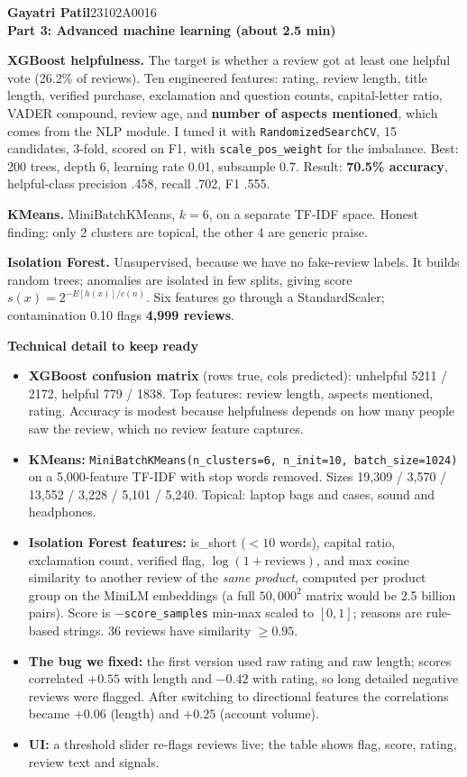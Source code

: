 \documentclass[10pt,a4paper]{article}
\newcommand{\lab}[1]{{\color{accent}\bfseries #1}}
\newcommand{\speaker}[3]{%
  \begin{tcolorbox}[colback=navy,colframe=navy,arc=3pt,left=8pt,right=8pt,top=4pt,bottom=4pt]
  {\color{white}\bfseries\Large #1}\hfill{\color{white!70!navy}\small #2}\\[1pt]{\color{accent!60!white}\bfseries #3}
  \end{tcolorbox}\vspace{-2pt}}
\begin{document}
\speaker{Gayatri Patil}{23102A0016}{Part 3: Advanced machine learning \quad (about 2.5 min)}
\begin{say}
\lab{XGBoost helpfulness.} The target is whether a review got at least one helpful vote (26.2\% of reviews). Ten engineered features: rating, review length, title length, verified purchase, exclamation and question counts, capital-letter ratio, VADER compound, review age, and \textbf{number of aspects mentioned}, which comes from the NLP module. I tuned it with \texttt{RandomizedSearchCV}, 15 candidates, 3-fold, scored on F1, with \texttt{scale\_pos\_weight} for the imbalance. Best: 200 trees, depth 6, learning rate 0.01, subsample 0.7. Result: \textbf{70.5\% accuracy}, helpful-class precision .458, recall .702, F1 .555.\par
\lab{KMeans.} MiniBatchKMeans, $k=6$, on a separate TF-IDF space. Honest finding: only 2 clusters are topical, the other 4 are generic praise.\par
\lab{Isolation Forest.} Unsupervised, because we have no fake-review labels. It builds random trees; anomalies are isolated in few splits, giving score $s(x)=2^{-E[h(x)]/c(n)}$. Six features go through a StandardScaler; contamination 0.10 flags \textbf{4,999 reviews}.
\end{say}
\par\vspace{2pt}\textbf{Technical detail to keep ready}\par
\begin{itemize}
\item \textbf{XGBoost confusion matrix} (rows true, cols predicted): unhelpful 5211 / 2172, helpful 779 / 1838. Top features: review length, aspects mentioned, rating. Accuracy is modest because helpfulness depends on how many people saw the review, which no review feature captures.
\item \textbf{KMeans:} \texttt{MiniBatchKMeans(n\_clusters=6, n\_init=10, batch\_size=1024)} on a 5,000-feature TF-IDF with stop words removed. Sizes 19,309 / 3,570 / 13,552 / 3,228 / 5,101 / 5,240. Topical: laptop bags and cases, sound and headphones.
\item \textbf{Isolation Forest features:} is\_short ($<10$ words), capital ratio, exclamation count, verified flag, $\log(1+\mathrm{reviews})$, and max cosine similarity to another review of the \emph{same product}, computed per product group on the MiniLM embeddings (a full $50{,}000^2$ matrix would be 2.5 billion pairs). Score is $-$\texttt{score\_samples} min-max scaled to $[0,1]$; reasons are rule-based strings. 36 reviews have similarity $\ge0.95$.
\item \textbf{The bug we fixed:} the first version used raw rating and raw length; scores correlated $+0.55$ with length and $-0.42$ with rating, so long detailed negative reviews were flagged. After switching to directional features the correlations became $+0.06$ (length) and $+0.25$ (account volume).
\item \textbf{UI:} a threshold slider re-flags reviews live; the table shows flag, score, rating, review text and signals.
\end{itemize}
\end{document}
